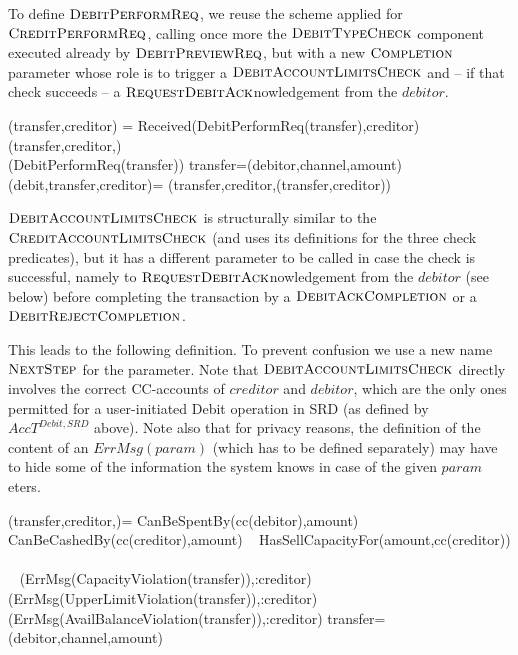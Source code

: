 To define $\hbox{\sc DebitPerformReq}$, we reuse the scheme applied for $\hbox{\sc CreditPerformReq}$, calling once more the $\hbox{\sc DebitTypeCheck}$ component executed already by $\hbox{\sc DebitPreviewReq}$, but with a new $\hbox{\sc Completion}$ parameter whose role is to trigger a $\hbox{\sc DebitAccountLimitsCheck}$ and -- if that check succeeds -- a $\hbox{\sc RequestDebitAck}$nowledgement from the $debitor$.   

\begin{asm}
(transfer,creditor)  =\+
\IF Received(DebitPerformReq(transfer),\FROM creditor) \THEN \+  
   (transfer,creditor,)\\
   (DebitPerformReq(transfer))\-
\WHERE \+
transfer=(debitor,channel,amount)\\
(debit,transfer,creditor)=\+
(transfer,creditor,(transfer,creditor))
\end{asm}

$\hbox{\sc DebitAccountLimitsCheck}$ is structurally similar to the $\hbox{\sc CreditAccountLimitsCheck}$ (and uses its definitions for the three check predicates), but it has a different parameter to be called in case the check is successful, namely to $\hbox{\sc RequestDebitAck}$nowledgement from the $debitor$ (see below) before completing the transaction by a $\hbox{\sc DebitAckCompletion}$ or a $\hbox{\sc DebitRejectCompletion}$. 

This leads to the following definition. To prevent confusion we use a new name 
$\hbox{\sc NextStep}$ for the parameter. Note that $\hbox{\sc DebitAccountLimitsCheck}$ 
directly involves the correct CC-accounts of $creditor$ and $debitor$, which are 
the only ones permitted for a user-initiated Debit operation in SRD (as defined by $AccT^{Debit,SRD}$ above). Note also that for privacy reasons, the definition of the content of an $ErrMsg(param)$ (which has to be defined separately) may have to hide some of the information the system knows in case of the given $param$eters.


\begin{asm}
(transfer,creditor,)=\+
  \IF CanBeSpentBy(cc(debitor),amount) \+
    \THEN ~ \IF CanBeCashedBy(cc(creditor),amount) \+
       \THEN ~ \IF HasSellCapacityFor(amount,cc(creditor)) \+
           \THEN ~  \\
           \ELSE 
           ~ (ErrMsg(CapacityViolation(transfer)),\TO :creditor)\-
       \ELSE 
       ~ (ErrMsg(UpperLimitViolation(transfer)),\TO :creditor)\-
   \ELSE 
    ~ (ErrMsg(AvailBalanceViolation(transfer)),\TO :creditor)\dec\-
 \WHERE \+
    transfer=(debitor,channel,amount)
\end{asm}


